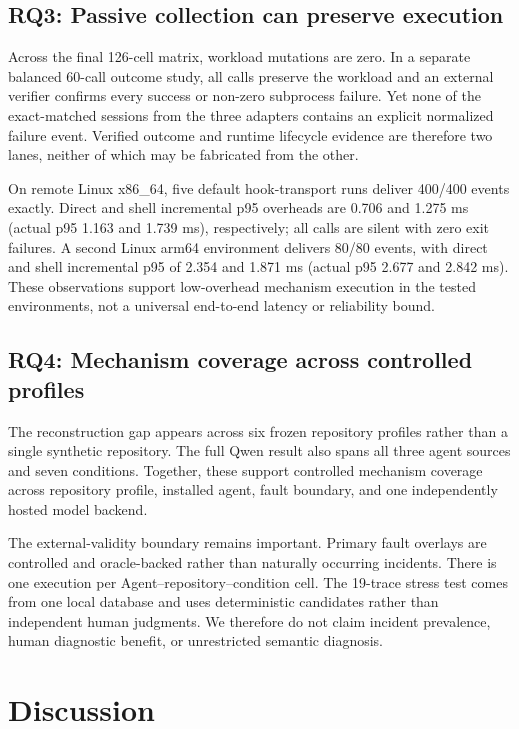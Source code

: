 \documentclass[runningheads]{llncs}
\begin{document}
\subsection{RQ3: Passive collection can preserve execution}

Across the final 126-cell matrix, workload mutations are zero.  In a separate
balanced 60-call outcome study, all calls preserve the workload and an external
verifier confirms every success or non-zero subprocess failure.  Yet none of
the exact-matched sessions from the three adapters contains an explicit
normalized failure event.  Verified outcome and runtime lifecycle evidence are
therefore two lanes, neither of which may be fabricated from the other.

On remote Linux x86\_64, five default hook-transport runs deliver 400/400 events
exactly. Direct and shell incremental p95 overheads are 0.706 and 1.275 ms
(actual p95 1.163 and 1.739 ms), respectively; all calls are silent with zero
exit failures. A second Linux arm64 environment delivers 80/80 events, with
direct and shell incremental p95 of 2.354 and 1.871 ms (actual p95 2.677 and
2.842 ms).
These observations support low-overhead mechanism execution in the tested
environments, not a universal end-to-end latency or reliability bound.

\subsection{RQ4: Mechanism coverage across controlled profiles}

The reconstruction gap appears across six frozen repository profiles rather
than a single synthetic repository.  The full Qwen result also spans all three
agent sources and seven conditions. Together, these support controlled
mechanism coverage across repository profile, installed agent, fault boundary,
and one independently hosted model backend.

The external-validity boundary remains important.  Primary fault overlays are
controlled and oracle-backed rather than naturally occurring incidents.  There
is one execution per Agent--repository--condition cell.  The 19-trace stress test
comes from one local database and uses deterministic candidates rather than
independent human judgments.  We therefore do not claim incident prevalence,
human diagnostic benefit, or unrestricted semantic diagnosis.

\section{Discussion}
\end{document}

